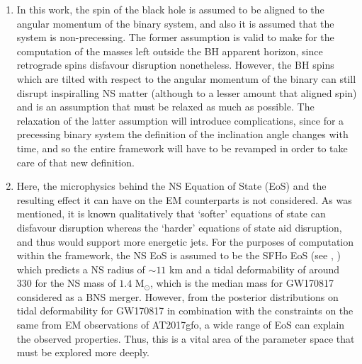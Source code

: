        \begin{enumerate}

            \item In this work, the spin of the black hole is assumed to be aligned to
                the angular momentum of the binary system, and also it is assumed that
                the system is non-precessing. The former assumption is valid to make for
                the computation of the masses left outside the BH apparent horizon,
                since retrograde spins disfavour disruption nonetheless. However, the BH
                spins which are tilted with respect to the angular momentum of the
                binary can still disrupt inspiralling NS matter (although to a lesser
                amount that aligned spin) and is an assumption that must be relaxed as
                much as possible. The relaxation of the latter assumption will introduce
                complications, since for a precessing binary system the definition of
                the inclination angle changes with time, and so the entire framework
                will have to be revamped in order to take care of that new definition.

            \item Here, the microphysics behind the NS Equation of State (EoS) and the
                resulting effect it can have on the EM counterparts is not considered.
                As was mentioned, it is known qualitatively that `softer' equations of
                state can disfavour disruption whereas the `harder' equations of state
                aid disruption, and thus would support more energetic jets. For the
                purposes of computation within the framework, the NS EoS is assumed to
                be the SFHo EoS (see \cite{hempel_2010}, \cite{hempel_2012}) which
                predicts a NS radius of $\sim 11$ km and a tidal deformability of around
                330 for the NS mass of $1.4$ M$_\odot$, which is the median mass for
                GW170817 considered as a BNS merger.  However, from the posterior
                distributions on tidal deformability for GW170817 in combination with
                the constraints on the same from EM observations of AT2017gfo, a wide
                range of EoS can explain the observed properties. Thus, this is a vital
                area of the parameter space that must be explored more deeply.


\end{enumerate}
